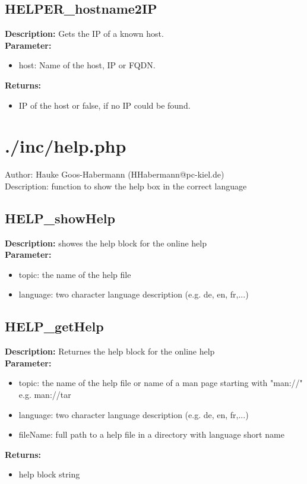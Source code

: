 \subsection{HELPER\_hostname2IP}
\textbf{Description:} Gets the IP of a known host.\\
\textbf{Parameter:}
\begin{itemize}
\item host: Name of the host, IP or FQDN.
\end{itemize}
\textbf{Returns:}
\begin{itemize}
\item IP of the host or false, if no IP could be found.
\end{itemize}

\newpage\section{./inc/help.php}
 Author: Hauke Goos-Habermann (HHabermann@pc-kiel.de)\\
 Description: function to show the help box in the correct language\\

\subsection{HELP\_showHelp}
\textbf{Description:} showes the help block for the online help\\
\textbf{Parameter:}
\begin{itemize}
\item topic: the name of the help file
\item language: two character language description (e.g. de, en, fr,...)
\end{itemize}

\subsection{HELP\_getHelp}
\textbf{Description:} Returnes the help block for the online help\\
\textbf{Parameter:}
\begin{itemize}
\item topic: the name of the help file or name of a man page starting with "man://" e.g. man://tar
\item language: two character language description (e.g. de, en, fr,...)
\item fileName: full path to a help file in a directory with language short name
\end{itemize}
\textbf{Returns:}
\begin{itemize}
\item help block string
\end{itemize}

